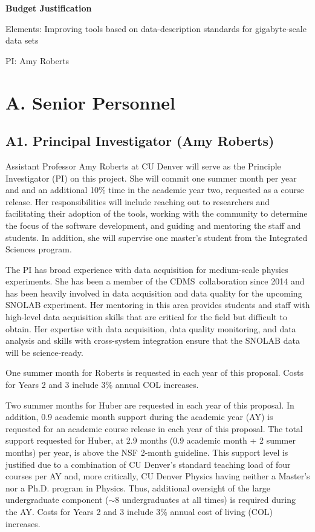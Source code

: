 \documentclass[11pt]{article}
\newcommand{\CDMS}{{\small CDMS}}
\begin{document}

\centerline{\bf Budget Justification}
\centerline{Elements: Improving tools based on data-description standards for gigabyte-scale data sets}
\centerline{PI: Amy Roberts}


\section*{A. Senior Personnel}

\subsection*{A1. Principal Investigator (Amy Roberts)}

Assistant Professor Amy Roberts at CU Denver will serve as the Principle Investigator (PI) on this project.  She will commit one summer month per year and and an additional 10\% time in the academic year two, requested as a course release. Her responsibilities will include reaching out to researchers and facilitating their adoption of the tools, working with the community to determine the focus of the software development, and guiding and mentoring the staff and students.  In addition, she will supervise one master's student from the Integrated Sciences program.

The PI has broad experience with data acquisition for medium-scale physics experiments.  She has been a member of the \CDMS\ collaboration since 2014 and has been heavily involved in data acquisition and data quality for the upcoming SNOLAB experiment.  
Her mentoring in this area provides students and staff with high-level data acquisition skills that are critical for the field but difficult to obtain.  Her expertise with data acquisition, data quality monitoring, and data analysis and skills with cross-system integration ensure that the SNOLAB data will be science-ready.

One summer month for Roberts is requested in each year of this proposal. Costs for Years 2 and 3 include 3\% annual COL increases. 

Two summer months for Huber are requested in each year of this proposal. In addition, 0.9 academic month support during the academic year (AY) is requested for an academic course release in each year of this proposal. The total support requested for Huber, at 2.9 months (0.9 academic month + 2 summer months) per year, is above the NSF 2-month guideline. This support level is justified due to a combination of CU Denver's standard teaching load of four courses per AY and, more critically, CU Denver Physics having neither a Master's nor a Ph.D. program in Physics. Thus, additional oversight of the large undergraduate component ($\sim$8 undergraduates at all times) is required during the AY. Costs for Years 2 and 3 include 3\% annual cost of living (COL) increases. 
\end{document}
